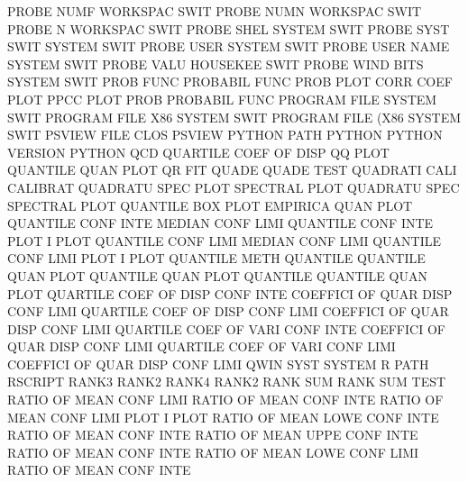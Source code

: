 PROBE    NUMF                           WORKSPAC SWIT
PROBE    NUMN                           WORKSPAC SWIT
PROBE    N                              WORKSPAC SWIT
PROBE    SHEL                           SYSTEM   SWIT
PROBE    SYST SWIT                      SYSTEM   SWIT
PROBE    USER                           SYSTEM   SWIT
PROBE    USER NAME                      SYSTEM   SWIT
PROBE    VALU                           HOUSEKEE SWIT
PROBE    WIND BITS                      SYSTEM   SWIT
PROB     FUNC                           PROBABIL FUNC
PROB     PLOT CORR COEF PLOT            PPCC     PLOT
PROB                                    PROBABIL FUNC
PROGRAM  FILE                           SYSTEM   SWIT
PROGRAM  FILE X86                       SYSTEM   SWIT
PROGRAM  FILE (X86                      SYSTEM   SWIT
PSVIEW   FILE CLOS                      PSVIEW
PYTHON   PATH                           PYTHON
PYTHON   VERSION                        PYTHON
QCD                                     QUARTILE COEF OF   DISP
QQ       PLOT                           QUANTILE QUAN PLOT
QR                                      FIT
QUADE                                   QUADE    TEST
QUADRATI CALI                           CALIBRAT
QUADRATU SPEC PLOT                      SPECTRAL PLOT
QUADRATU SPEC                           SPECTRAL PLOT
QUANTILE BOX  PLOT                      EMPIRICA QUAN PLOT
QUANTILE CONF INTE                      MEDIAN   CONF LIMI
QUANTILE CONF INTE PLOT                 I        PLOT
QUANTILE CONF LIMI                      MEDIAN   CONF LIMI
QUANTILE CONF LIMI PLOT                 I        PLOT
QUANTILE METH                           QUANTILE
QUANTILE QUAN PLOT                      QUANTILE QUAN PLOT
QUANTILE                                QUANTILE QUAN PLOT
QUARTILE COEF OF   DISP CONF INTE       COEFFICI OF   QUAR DISP CONF LIMI
QUARTILE COEF OF   DISP CONF LIMI       COEFFICI OF   QUAR DISP CONF LIMI
QUARTILE COEF OF   VARI CONF INTE       COEFFICI OF   QUAR DISP CONF LIMI
QUARTILE COEF OF   VARI CONF LIMI       COEFFICI OF   QUAR DISP CONF LIMI
QWIN     SYST                           SYSTEM
R        PATH                           RSCRIPT
RANK3                                   RANK2
RANK4                                   RANK2
RANK     SUM                            RANK     SUM  TEST
RATIO    OF   MEAN CONF LIMI            RATIO    OF   MEAN CONF INTE
RATIO    OF   MEAN CONF LIMI PLOT       I        PLOT
RATIO    OF   MEAN LOWE CONF INTE       RATIO    OF   MEAN CONF INTE
RATIO    OF   MEAN UPPE CONF INTE       RATIO    OF   MEAN CONF INTE
RATIO    OF   MEAN LOWE CONF LIMI       RATIO    OF   MEAN CONF INTE

